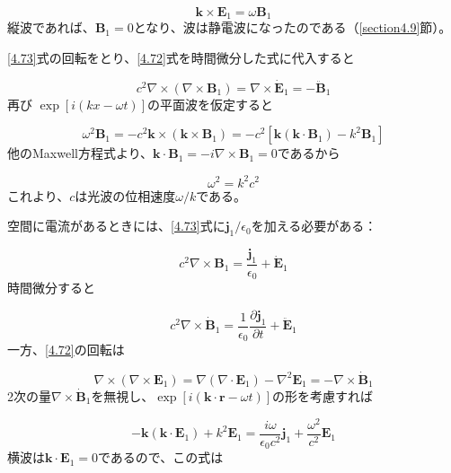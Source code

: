 \documentclass{ltjsarticle}
\numberwithin{equation}{section} %
\begin{document}
\[
  \bm{k} \times \bm{E}_1 = \omega \bm{B}_1
\]
縦波であれば、$\bm{B}_1 = 0$となり、波は静電波になったのである（\ref{section4.9}節）。


\eqref{4.73}式の回転をとり、\eqref{4.72}式を時間微分した式に代入すると

\begin{equation}
  c^2 \nabla \times (\nabla \times \bm{B}_1) = \nabla \times \dot{\bm{E}}_1 = -\ddot{\bm{B}}_1 \label{4.74}
\end{equation}
再び $\exp[i(kx-\omega t)]$の平面波を仮定すると

\begin{equation}
  \omega^2 \bm{B}_1 = -c^2\bm{k} \times (\bm{k} \times \bm{B}_1) = -c^2[\bm{k}(\bm{k}\cdot \bm{B}_1) - k^2\bm{B}_1] \label{4.75}
\end{equation}
他のMaxwell方程式より、$\bm{k} \cdot \bm{B}_1 = -i\nabla \times \bm{B}_1 = 0$であるから

\begin{equation}
  \omega^2 = k^2c^2 \label{4.76}
\end{equation}
これより、$c$は光波の位相速度$\omega / k$である。

空間に電流があるときには、\eqref{4.73}式に$\bm{j}_1/\epsilon_0$を加える必要がある：

\begin{equation}
  c^2\nabla \times \bm{B}_1 = \frac{\bm{j}_1}{\epsilon_0} + \dot{\bm{E}}_1 \label{4.77}
\end{equation}
時間微分すると

\begin{equation}
  c^2\nabla \times \dot{\bm{B}}_1 = \frac{1}{\epsilon_0}\frac{\partial \bm{j}_1}{\partial t} + \ddot{\bm{E}}_1 \label{4.78}
\end{equation}
一方、\eqref{4.72}の回転は

\begin{equation}
  \nabla \times (\nabla \times \bm{E}_1) = \nabla(\nabla \cdot \bm{E}_1) - \nabla^2 \bm{E}_1 = -\nabla \times \dot{\bm{B}}_1 \label{4.79}
\end{equation}
2次の量$\nabla \times \dot{\bm{B}}_1$を無視し、$\exp [i(\bm{k}\cdot \bm{r} - \omega t)]$の形を考慮すれば

\begin{equation}
  -\bm{k}(\bm{k}\cdot \bm{E}_1) + k^2\bm{E}_1 = \frac{i\omega}{\epsilon_0 c^2}\bm{j}_1 + \frac{\omega^2}{c^2}\bm{E}_1 \label{4.80}
\end{equation}
横波は$\bm{k}\cdot \bm{E}_1 =0$であるので、この式は
\end{document}
